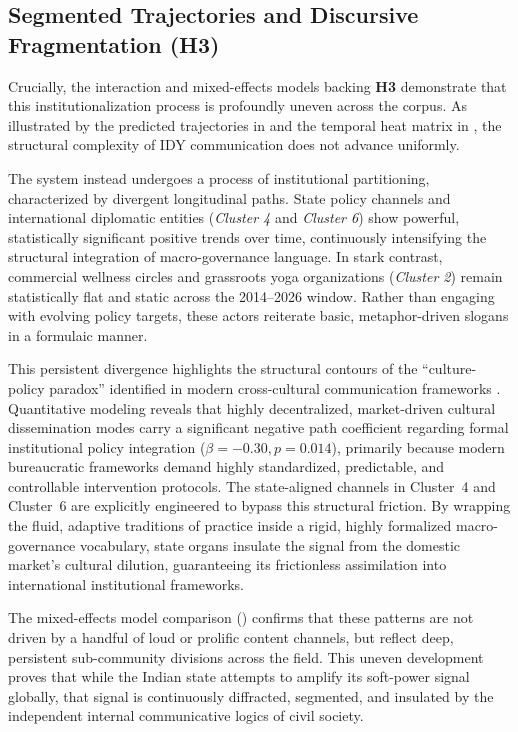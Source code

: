 \documentclass[11pt]{article}
\begin{document}
\subsection{Segmented Trajectories and Discursive Fragmentation (H3)}
Crucially, the interaction and mixed-effects models backing \textbf{H3} demonstrate that this institutionalization process is profoundly uneven across the corpus. As illustrated by the predicted trajectories in  and the temporal heat matrix in , the structural complexity of IDY communication does not advance uniformly. 

The system instead undergoes a process of institutional partitioning, characterized by divergent longitudinal paths. State policy channels and international diplomatic entities (\textit{Cluster 4} and \textit{Cluster 6}) show powerful, statistically significant positive trends over time, continuously intensifying the structural integration of macro-governance language. In stark contrast, commercial wellness circles and grassroots yoga organizations (\textit{Cluster 2}) remain statistically flat and static across the 2014--2026 window. Rather than engaging with evolving policy targets, these actors reiterate basic, metaphor-driven slogans in a formulaic manner.

This persistent divergence highlights the structural contours of the ``culture-policy paradox'' identified in modern cross-cultural communication frameworks \cite{zhou2026yoga}. Quantitative modeling reveals that highly decentralized, market-driven cultural dissemination modes carry a significant negative path coefficient regarding formal institutional policy integration ($\beta = -0.30, p = 0.014$), primarily because modern bureaucratic frameworks demand highly standardized, predictable, and controllable intervention protocols. The state-aligned channels in Cluster~4 and Cluster~6 are explicitly engineered to bypass this structural friction. By wrapping the fluid, adaptive traditions of practice inside a rigid, highly formalized macro-governance vocabulary, state organs insulate the signal from the domestic market's cultural dilution, guaranteeing its frictionless assimilation into international institutional frameworks.

 The mixed-effects model comparison () confirms that these patterns are not driven by a handful of loud or prolific content channels, but reflect deep, persistent sub-community divisions across the field. This uneven development proves that while the Indian state attempts to amplify its soft-power signal globally, that signal is continuously diffracted, segmented, and insulated by the independent internal communicative logics of civil society.
\end{document}
